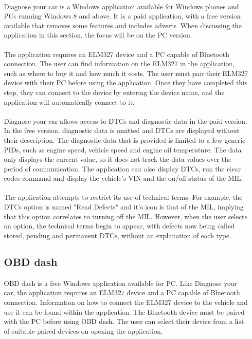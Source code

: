 		\paragraph{}{
		Diagnose your car is a Windows application available for Windows phones and PCs running Windows 8 and above. It is a paid application, with a free version available that removes some features and includes adverts. When discussing the application in this section, the focus will be on the PC version.
		}
		\paragraph{}{
		The application requires an ELM327 device and a PC capable of Bluetooth connection. The user can find information on the ELM327 in the application, such as where to buy it and how much it costs. The user must pair their ELM327 device with their PC before using the application. Once they have completed this step, they can connect to the device by entering the device name, and the application will automatically connect to it.
		}
		\paragraph{}{
		Diagnose your car allows access to DTCs and diagnostic data in the paid version. In the free version, diagnostic data is omitted and DTCs are displayed without their description. The diagnostic data that is provided is limited to a few generic PIDs, such as engine speed, vehicle speed and engine oil temperature. The data only displays the current value, so it does not track the data values over the period of communication. The application can also display DTCs, run the clear codes command and display the vehicle's VIN and the on/off status of the MIL.		
		}
		\paragraph{}{
		The application attempts to restrict its use of technical terms. For example, the DTCs option is named "Read Defects" and it's icon is that of the MIL, implying that this option correlates to turning off the MIL. However, when the user selects an option, the technical terms begin to appear, with defects now being called stored, pending and permanent DTCs, without an explanation of each type. 
		}		
	\subsection{OBD dash}
		\paragraph{}{
		OBD dash is a free Windows application available for PC. Like Diagnose your car, the application requires an ELM327 device and a PC capable of Bluetooth connection. Information on how to connect the ELM327 device to the vehicle and use it can be found within the application. The Bluetooth device must be paired with the PC before using OBD dash. The user can select their device from a list of suitable paired devices on opening the application.	
		}
